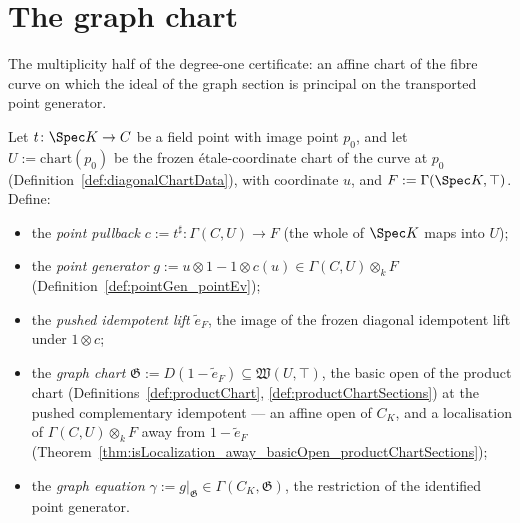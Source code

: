\section{The graph chart}
\label{sec:graphChart}

The multiplicity half of the degree-one certificate: an affine chart of the fibre curve on
which the ideal of the graph section is principal on the transported point generator.

\begin{definition}
  \label{def:graphChart}
  \leanok
  Let \(t \colon \Spec K \to C\) be a field point with image point \(p_0\), and let
  \(U := \mathrm{chart}(p_0)\) be the frozen \'etale-coordinate chart of the curve at
  \(p_0\) (Definition~\ref{def:diagonalChartData}), with coordinate \(u\), and
  \(F := \Gamma(\Spec K, \top)\). Define:
  \begin{itemize}
  \item the \emph{point pullback} \(c := t^{\sharp} \colon \Gamma(C, U) \to F\) (the whole
    of \(\Spec K\) maps into \(U\));
  \item the \emph{point generator} \(g := u \otimes 1 - 1 \otimes c(u) \in
    \Gamma(C,U) \otimes_k F\) (Definition~\ref{def:pointGen_pointEv});
  \item the \emph{pushed idempotent lift} \(\tilde e_F\), the image of the frozen diagonal
    idempotent lift under \(1 \otimes c\);
  \item the \emph{graph chart} \(\mathfrak G := D(1 - \tilde e_F) \subseteq
    \mathfrak W(U, \top)\), the basic open of the product chart
    (Definitions~\ref{def:productChart}, \ref{def:productChartSections}) at the pushed
    complementary idempotent — an affine open of \(C_K\), and a localisation of
    \(\Gamma(C,U) \otimes_k F\) away from \(1 - \tilde e_F\)
    (Theorem~\ref{thm:isLocalization_away_basicOpen_productChartSections});
  \item the \emph{graph equation} \(\gamma := g|_{\mathfrak G} \in
    \Gamma(C_K, \mathfrak G)\), the restriction of the identified point generator.
  \end{itemize}
\end{definition}

